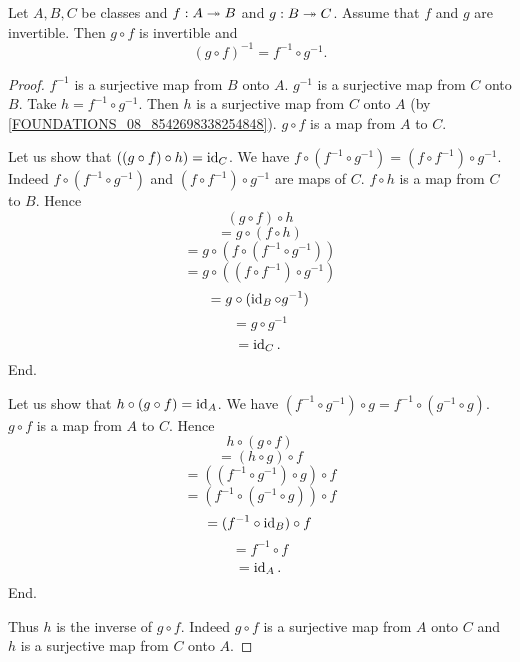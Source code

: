 \documentclass[../../set-theory/set-theory.tex]{subfiles}
\begin{document}
  \begin{forthel}
    \begin{proposition}
      Let $A, B, C$ be classes and $f : A \twoheadrightarrow B$ and $g : B \twoheadrightarrow C$.
      Assume that $f$ and $g$ are invertible.
      Then $g \circ f$ is invertible and
      \[ (g \circ f)^{-1} = f^{-1} \circ g^{-1}. \]
    \end{proposition}
    \begin{proof}
      $f^{-1}$ is a surjective map from $B$ onto $A$.
      $g^{-1}$ is a surjective map from $C$ onto $B$.
      Take $h = f^{-1} \circ g^{-1}$.
      Then $h$ is a surjective map from $C$ onto $A$
      (by \cref{FOUNDATIONS_08_8542698338254848}).
      $g \circ f$ is a map from $A$ to $C$.

      Let us show that $((g \circ f) \circ h) = \operatorname{id}_{C}$.
        We have $f \circ (f^{-1} \circ g^{-1}) = (f \circ f^{-1}) \circ g^{-1}$.
        Indeed $f \circ (f^{-1} \circ g^{-1})$ and
        $(f \circ f^{-1}) \circ g^{-1}$ are maps of $C$.
        $f \circ h$ is a map from $C$ to $B$.
        Hence
        \[  (g \circ f) \circ h                           \]
        \[    = g \circ (f \circ h)                       \]
        \[    = g \circ (f \circ (f^{-1} \circ g^{-1}))   \]
        \[    = g \circ ((f \circ f^{-1}) \circ g^{-1})   \]
        \[    = g \circ (\operatorname{id}_{B} \circ g^{-1})            \]
        \[    = g \circ g^{-1}                            \]
        \[    = \operatorname{id}_{C}.                                  \]
      End.

      Let us show that $h \circ (g \circ f) = \operatorname{id}_{A}$.
        We have $(f^{-1} \circ g^{-1}) \circ g = f^{-1} \circ (g^{-1} \circ g)$.
        $g \circ f$ is a map from $A$ to $C$.
        Hence
        \[  h \circ (g \circ f)                           \]
        \[    = (h \circ g) \circ f                       \]
        \[    = ((f^{-1} \circ g^{-1}) \circ g) \circ f   \]
        \[    = (f^{-1} \circ (g^{-1} \circ g)) \circ f   \]
        \[    = (f^{-1} \circ \operatorname{id}_{B}) \circ f            \]
        \[    = f^{-1} \circ f                            \]
        \[    = \operatorname{id}_{A}.                                  \]
      End.

      Thus $h$ is the inverse of $g \circ f$.
      Indeed $g \circ f$ is a surjective map from $A$ onto $C$ and $h$ is a
      surjective map from $C$ onto $A$.
    \end{proof}
  \end{forthel}
\end{document}
